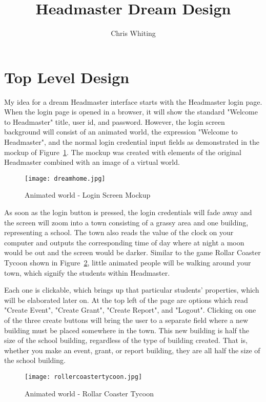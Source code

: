\documentclass[11pt]{article}
\title{Headmaster Dream Design}
\author{Chris Whiting}
\begin{document}
\maketitle

 
\section{Top Level Design}
My idea for a dream Headmaster interface starts with the Headmaster login page. When the login page is opened in a browser, it will show the standard "Welcome to Headmaster" title, user id, and password. However, the login screen background will consist of an animated world, the expression "Welcome to Headmaster", and the normal login credential input fields as demonstrated in the mockup of Figure~\ref{homepage}. The mockup was created with elements of the original Headmaster combined with an image of a virtual world.

\begin{figure}[h]
\centering
\texttt{[image: dreamhome.jpg]}
\caption{Animated world - Login Screen Mockup}
\label{homepage}
\end{figure}

As soon as the login button is pressed, the login credentials will fade away and the screen will zoom into a town consisting of a grassy area and one building, representing a school. The town also reads the value of the clock on your computer and outputs the corresponding time of day where at night a moon would be out and the screen would be darker. Similar to the game Rollar Coaster Tycoon \cite{rcoast} shown in Figure~\ref{RCT}, little animated people will be walking around your town, which signify the students within Headmaster.

 Each one is clickable, which brings up that particular students' properties, which will be elaborated later on. At the top left of the page are options which read "Create Event", "Create Grant", "Create Report", and "Logout". Clicking on one of the three create buttons will bring the user to a separate field where a new building must be placed somewhere in the town. This new building is half the size of the school building, regardless of the type of building created. That is, whether you make an event, grant, or report building, they are all half the size of the school building. 

\begin{figure}[h]
\centering
\texttt{[image: rollercoastertycoon.jpg]}
\caption{Animated world - Rollar Coaster Tycoon}
\label{RCT}
\end{figure}
\end{document}
